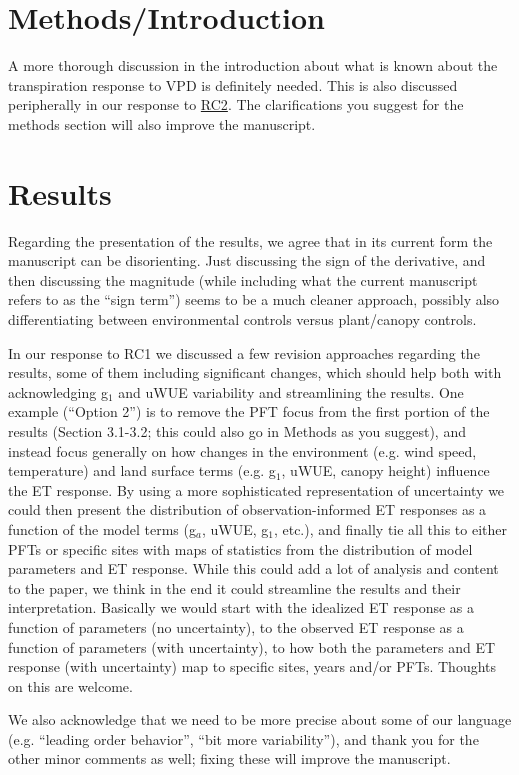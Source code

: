 \documentclass[12pt]{article}
\begin{document}
\section{Methods/Introduction}
A more thorough discussion in the introduction about what is known
about the transpiration response to VPD is definitely needed. This is
also discussed peripherally in our response to
\href{https://editor.copernicus.org/index.php/hess-2018-553-AC2.pdf?_mdl=msover_md&_jrl=13&_lcm=oc108lcm109w&_acm=get_comm_file&_ms=72556&c=154058&salt=19427645101542423504}{RC2}. The clarifications you
suggest for the methods section will also improve the manuscript.

\section{Results}
Regarding the presentation of the results, we agree that in its current
form the manuscript can be disorienting. Just discussing the sign of
the derivative, and then discussing the magnitude (while including
what the current manuscript refers to as the ``sign term'') seems to
be a much cleaner approach, possibly also differentiating between
environmental controls versus plant/canopy controls.

In our response to RC1 we discussed a few revision approaches
regarding the results, some of them including significant changes,
which should help both with acknowledging g$_1$ and uWUE variability
and streamlining the results. One example (``Option 2'') is to remove
the PFT focus from the first portion of the results (Section 3.1-3.2;
this could also go in Methods as you suggest), and instead focus
generally on how changes in the environment (e.g. wind speed,
temperature) and land surface terms (e.g. g$_1$, uWUE, canopy height)
influence the ET response. By using a more sophisticated representation
of uncertainty we could then present the distribution of
observation-informed ET responses as a function of the model terms
(g$_a$, uWUE, g$_1$, etc.), and finally tie all this to either PFTs or
specific sites with maps of statistics from the distribution of model
parameters and ET response. While this could add a lot of analysis and
content to the paper, we think in the end it could streamline the
results and their interpretation. Basically we would start with the
idealized ET response as a function of parameters (no uncertainty), to
the observed ET response as a function of parameters (with
uncertainty), to how both the parameters and ET response (with
uncertainty) map to specific sites, years and/or PFTs. Thoughts on
this are welcome.

We also acknowledge that we need to be more precise about some of our
language (e.g. ``leading order behavior'', ``bit more variability''),
and thank you for the other minor comments as well; fixing these will
improve the manuscript.
\end{document}
